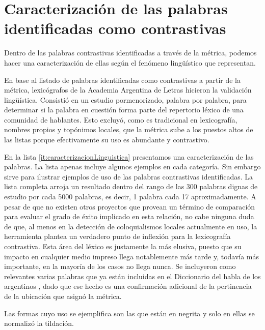 
\section{Caracterización de las palabras identificadas como contrastivas}
\label{caracterizacion_resultados}

Dentro de las palabras contrastivas identificadas a través de la métrica, podemos hacer una caracterización de ellas según el fenómeno lingüístico que representan.


En base al listado de palabras identificadas como contrastivas a partir de la métrica, lexicógrafos de la Academia Argentina de Letras hicieron la validación lingüística. Consistió en un estudio pormenorizado, palabra por palabra, para determinar si la palabra en cuestión forma parte del repertorio léxico de una comunidad de hablantes. Esto excluyó, como es tradicional en lexicografía, nombres propios y topónimos locales, que la métrica sube a los puestos altos de las listas porque efectivamente su uso es abundante y contrastivo. 

En la lista \ref{it:caracterizacionLinguistica} presentamos una caracterización de las palabras. La lista apenas incluye algunos ejemplos en cada categoría. Sin embargo sirve para ilustrar ejemplos de uso de las palabras contrastivas identificadas. La lista completa arroja un resultado dentro del rango de las 300 palabras dignas de estudio por cada 5000 palabras, es decir, 1 palabra cada 17 aproximadamente. A pesar de que no existen otros proyectos que provean un término de comparación para evaluar el grado de éxito implicado en esta relación, no cabe ninguna duda de que, al menos en la detección de coloquialismos locales actualmente en uso, la herramienta plantea un verdadero punto de inflexión para la lexicografía contrastiva. Esta área del léxico es justamente la más elusiva, puesto que su impacto en cualquier medio impreso llega notablemente más tarde y, todavía más importante, en la mayoría de los casos no llega nunca. Se incluyeron como relevantes varias palabras que ya están incluidas en el Diccionario del habla de los argentinos \cite{academia2008diccionario}, dado que ese hecho es una confirmación adicional de la pertinencia de la ubicación que asignó la métrica.

Las formas cuyo uso se ejemplifica son las que están en negrita y solo en ellas se normalizó la tildación.

